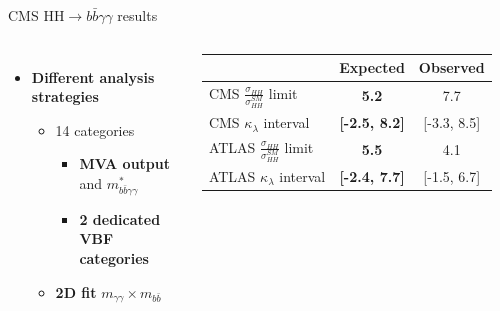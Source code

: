 \begin{frame}{CMS HH$\to b\bar{b}\gamma\gamma$ results}

\begin{columns}

\begin{itemize}
    \item \textbf{\textcolor{structurColor}{Different analysis strategies}}
    \begin{itemize}
        \item 14 categories
        \begin{itemize}
            \item \textbf{MVA output} and \textbf{$m_{b\bar{b}\gamma\gamma}^{*}$}
            \item \textbf{2 dedicated VBF categories} 
        \end{itemize}
        \item \textcolor{HHturquoise_d}{\textbf{2D fit}} $m_{\gamma\gamma}\times m_{b\bar{b}}$
    \end{itemize}
\end{itemize}

\begin{table}[]
    \centering
    \begin{tabular}{lcc}
    \hline\hline
    & Expected & Observed \\
    \hline 
    CMS $\frac{\sigma_{HH}}{\sigma_{HH}^{SM}}$ limit & \textbf{5.2} & 7.7 \\
    CMS $\kappa_{\lambda}$ interval & \textbf{[-2.5, 8.2]} & [-3.3, 8.5] \\
    \hline 
    ATLAS $\frac{\sigma_{HH}}{\sigma_{HH}^{SM}}$ limit & \textbf{5.5} & 4.1 \\
    ATLAS $\kappa_{\lambda}$ interval & \textcolor{HHred}{\textbf{[-2.4, 7.7]}} & [-1.5, 6.7] \\ 
    \hline\hline
    \end{tabular}
    
\end{table}



\end{columns}
\end{frame}
